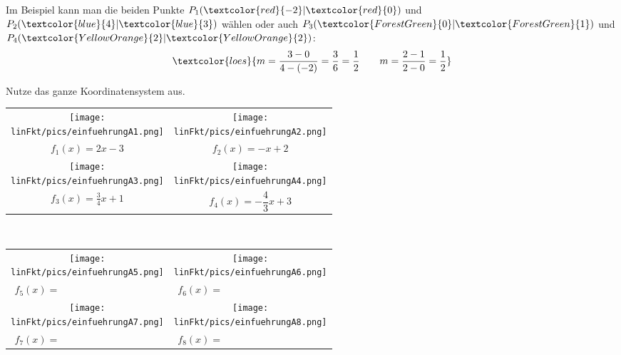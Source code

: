 Im Beispiel kann man die beiden Punkte $P_1(\textcolor{red}{-2}|\textcolor{red}{0})$ und $P_2(\textcolor{blue}{4}|\textcolor{blue}{3})$ wählen oder auch $P_3(\textcolor{ForestGreen}{0}|\textcolor{ForestGreen}{1})$ und $P_4(\textcolor{YellowOrange}{2}|\textcolor{YellowOrange}{2})$:
\begin{align*}
	\textcolor{loes}{m=\dfrac{3-0}{4-(-2)}=\dfrac{3}{6}=\dfrac{1}{2}
	\qquad
	m=\dfrac{2-1}{2-0}=\dfrac{1}{2}}
\end{align*}
\newpage
\begin{Exercise}[title={Zeichne das Schaubild der folgenden Funktionen}, label=lineareFktEinfuehrungA1]

	Nutze das ganze Koordinatensystem aus.

	\begin{minipage}[t]{\textwidth}
		\begin{tabular}{cc}
			\centering
			\texttt{[image: \\linFkt/pics/einfuehrungA1.png]}&\texttt{[image: \\linFkt/pics/einfuehrungA2.png]}  \\
			$f_1(x)=2x-3$&	$f_2(x)=-x+2$  \\ \addlinespace[20pt]
			\texttt{[image: \\linFkt/pics/einfuehrungA3.png]}&\texttt{[image: \\linFkt/pics/einfuehrungA4.png]}  \\
			$f_3(x)=\frac{3}{4}x+1$&	$f_4(x)=-\dfrac{4}{3}x+3$  \\
		\end{tabular}
\end{minipage}
\end{Exercise}
\newpage
\begin{Exercise}[title={Bestimme die Funktionsgleichung}, label=lineareFktEinfuehrungA2]\\
	\begin{minipage}[t]{\textwidth}
		\begin{tabular}{cc}
			\centering
			\texttt{[image: \\linFkt/pics/einfuehrungA5.png]}&\texttt{[image: \\linFkt/pics/einfuehrungA6.png]}  \\
			$f_5(x)=\qquad\qquad\qquad\qquad\qquad$&	$f_6(x)=\qquad\qquad\qquad\qquad\qquad$  \\ \addlinespace[20pt]
			\texttt{[image: \\linFkt/pics/einfuehrungA7.png]}&\texttt{[image: \\linFkt/pics/einfuehrungA8.png]}  \\
			$f_7(x)=\qquad\qquad\qquad\qquad\qquad$&	$f_8(x)=\qquad\qquad\qquad\qquad\qquad$  \\
		\end{tabular}
\end{minipage}
\end{Exercise}
